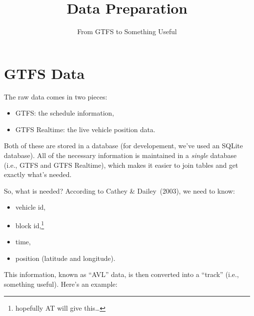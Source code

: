 \documentclass[10pt]{article}\usepackage[]{graphicx}\usepackage[]{color}
\title{Data Preparation}
\author{From GTFS to Something Useful}
\date{}
\begin{document}
\maketitle


\section{GTFS Data}

The raw data comes in two pieces:
\begin{itemize}
\item GTFS: the schedule information,
\item GTFS Realtime: the live vehicle position data.
\end{itemize}
Both of these are stored in a database (for developement, we've used an SQLite
database). All of the necessary information is maintained in a \emph{single} database
(i.e., GTFS and GTFS Realtime), which makes it easier to join tables and get exactly
what's needed.

So, what is needed? According to Cathey \& Dailey~(2003), we need to know:
\begin{itemize}
\item vehicle id,
\item block id,\footnote{hopefully AT will give this\ldots}
\item time,
\item position (latitude and longitude).
\end{itemize}
This information, known as ``AVL'' data, is then converted into a ``track'' (i.e., something useful). Here's an example:
\end{document}
